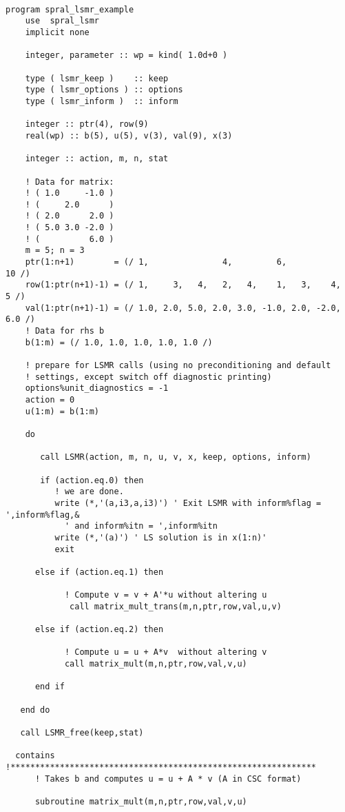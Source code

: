 \begin{verbatim}

program spral_lsmr_example
    use  spral_lsmr
    implicit none
  
    integer, parameter :: wp = kind( 1.0d+0 )

    type ( lsmr_keep )    :: keep 
    type ( lsmr_options ) :: options
    type ( lsmr_inform )  :: inform

    integer :: ptr(4), row(9)
    real(wp) :: b(5), u(5), v(3), val(9), x(3)

    integer :: action, m, n, stat

    ! Data for matrix:
    ! ( 1.0     -1.0 )
    ! (     2.0      )
    ! ( 2.0      2.0 )
    ! ( 5.0 3.0 -2.0 )
    ! (          6.0 )
    m = 5; n = 3
    ptr(1:n+1)        = (/ 1,               4,         6,                 10 /)
    row(1:ptr(n+1)-1) = (/ 1,     3,   4,   2,   4,    1,   3,    4,   5 /)
    val(1:ptr(n+1)-1) = (/ 1.0, 2.0, 5.0, 2.0, 3.0, -1.0, 2.0, -2.0, 6.0 /)
    ! Data for rhs b
    b(1:m) = (/ 1.0, 1.0, 1.0, 1.0, 1.0 /)

    ! prepare for LSMR calls (using no preconditioning and default
    ! settings, except switch off diagnostic printing)
    options%unit_diagnostics = -1
    action = 0
    u(1:m) = b(1:m)

    do

       call LSMR(action, m, n, u, v, x, keep, options, inform)

       if (action.eq.0) then
          ! we are done.
          write (*,'(a,i3,a,i3)') ' Exit LSMR with inform%flag = ',inform%flag,&
            ' and inform%itn = ',inform%itn
          write (*,'(a)') ' LS solution is in x(1:n)'
          exit

      else if (action.eq.1) then

            ! Compute v = v + A'*u without altering u
             call matrix_mult_trans(m,n,ptr,row,val,u,v)

      else if (action.eq.2) then

            ! Compute u = u + A*v  without altering v
            call matrix_mult(m,n,ptr,row,val,v,u)

      end if

   end do

   call LSMR_free(keep,stat)

  contains
!**************************************************************
      ! Takes b and computes u = u + A * v (A in CSC format)

      subroutine matrix_mult(m,n,ptr,row,val,v,u)


\end{verbatim}
